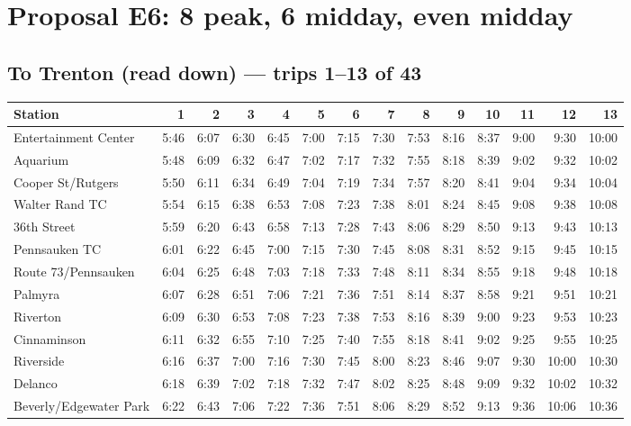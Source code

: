 \section{Proposal E6: 8 peak, 6 midday, even midday}\label{tt:proposal_E6}
\subsection*{To Trenton (read down) --- trips 1--13 of 43}
\begin{center}\footnotesize\setlength{\tabcolsep}{3pt}\begin{tabular}{@{}lrrrrrrrrrrrrr@{}}\toprule
Station & 1 & 2 & 3 & 4 & 5 & 6 & 7 & 8 & 9 & 10 & 11 & 12 & 13 \\\midrule
Entertainment Center & 5:46 & 6:07 & 6:30 & 6:45 & 7:00 & 7:15 & 7:30 & 7:53 & 8:16 & 8:37 & 9:00 & 9:30 & 10:00 \\
Aquarium & 5:48 & 6:09 & 6:32 & 6:47 & 7:02 & 7:17 & 7:32 & 7:55 & 8:18 & 8:39 & 9:02 & 9:32 & 10:02 \\
Cooper St/Rutgers & 5:50 & 6:11 & 6:34 & 6:49 & 7:04 & 7:19 & 7:34 & 7:57 & 8:20 & 8:41 & 9:04 & 9:34 & 10:04 \\
Walter Rand TC & 5:54 & 6:15 & 6:38 & 6:53 & 7:08 & 7:23 & 7:38 & 8:01 & 8:24 & 8:45 & 9:08 & 9:38 & 10:08 \\
36th Street & 5:59 & 6:20 & 6:43 & 6:58 & 7:13 & 7:28 & 7:43 & 8:06 & 8:29 & 8:50 & 9:13 & 9:43 & 10:13 \\
Pennsauken TC & 6:01 & 6:22 & 6:45 & 7:00 & 7:15 & 7:30 & 7:45 & 8:08 & 8:31 & 8:52 & 9:15 & 9:45 & 10:15 \\
Route 73/Pennsauken & 6:04 & 6:25 & 6:48 & 7:03 & 7:18 & 7:33 & 7:48 & 8:11 & 8:34 & 8:55 & 9:18 & 9:48 & 10:18 \\
Palmyra & 6:07 & 6:28 & 6:51 & 7:06 & 7:21 & 7:36 & 7:51 & 8:14 & 8:37 & 8:58 & 9:21 & 9:51 & 10:21 \\
Riverton & 6:09 & 6:30 & 6:53 & 7:08 & 7:23 & 7:38 & 7:53 & 8:16 & 8:39 & 9:00 & 9:23 & 9:53 & 10:23 \\
Cinnaminson & 6:11 & 6:32 & 6:55 & 7:10 & 7:25 & 7:40 & 7:55 & 8:18 & 8:41 & 9:02 & 9:25 & 9:55 & 10:25 \\
Riverside & 6:16 & 6:37 & 7:00 & 7:16 & 7:30 & 7:45 & 8:00 & 8:23 & 8:46 & 9:07 & 9:30 & 10:00 & 10:30 \\
Delanco & 6:18 & 6:39 & 7:02 & 7:18 & 7:32 & 7:47 & 8:02 & 8:25 & 8:48 & 9:09 & 9:32 & 10:02 & 10:32 \\
Beverly/Edgewater Park & 6:22 & 6:43 & 7:06 & 7:22 & 7:36 & 7:51 & 8:06 & 8:29 & 8:52 & 9:13 & 9:36 & 10:06 & 10:36 \\

\end{tabular}
\end{center}
